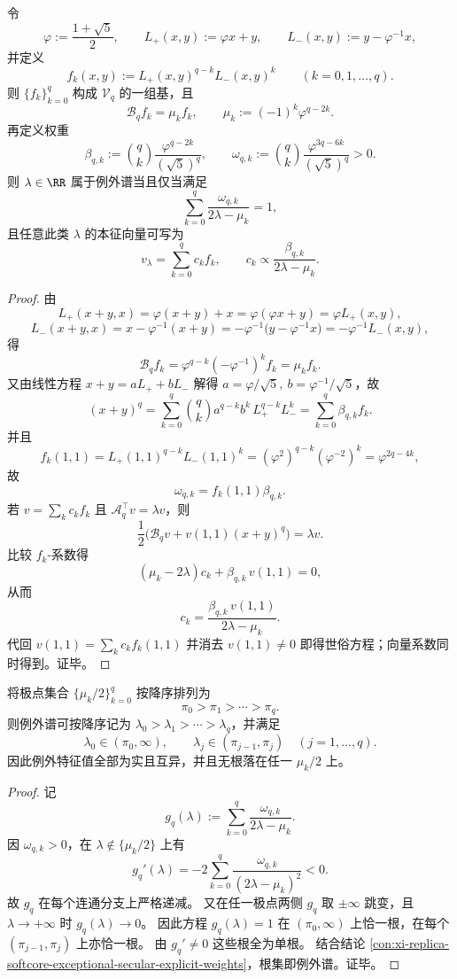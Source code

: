 \begin{conclusion}[例外谱的显式世俗方程与闭式本征向量]\label{con:xi-replica-softcore-exceptional-secular-explicit-weights}
令
\[
\varphi:=\frac{1+\sqrt5}{2},
\qquad
L_+(x,y):=\varphi x+y,
\qquad
L_-(x,y):=y-\varphi^{-1}x,
\]
并定义
\[
f_k(x,y):=L_+(x,y)^{q-k}L_-(x,y)^k
\qquad(k=0,1,\dots,q).
\]
则 \(\{f_k\}_{k=0}^{q}\) 构成 \(\mathcal V_q\) 的一组基，且
\[
\mathcal B_qf_k=\mu_kf_k,
\qquad
\mu_k:=(-1)^k\varphi^{q-2k}.
\]
再定义权重
\[
\beta_{q,k}:=\binom{q}{k}\frac{\varphi^{q-2k}}{(\sqrt5)^q},
\qquad
\omega_{q,k}:=\binom{q}{k}\frac{\varphi^{3q-6k}}{(\sqrt5)^q}>0.
\]
则 \(\lambda\in\RR\) 属于例外谱当且仅当满足
\[
\sum_{k=0}^{q}\frac{\omega_{q,k}}{2\lambda-\mu_k}=1,
\]
且任意此类 \(\lambda\) 的本征向量可写为
\[
v_\lambda=\sum_{k=0}^{q}c_kf_k,
\qquad
c_k\propto\frac{\beta_{q,k}}{2\lambda-\mu_k}.
\]
\end{conclusion}
\begin{proof}
由
\[
L_+(x+y,x)=\varphi(x+y)+x=\varphi(\varphi x+y)=\varphi L_+(x,y),
\]
\[
L_-(x+y,x)=x-\varphi^{-1}(x+y)=-\varphi^{-1}\bigl(y-\varphi^{-1}x\bigr)=-\varphi^{-1}L_-(x,y),
\]
得
\[
\mathcal B_qf_k=\varphi^{q-k}(-\varphi^{-1})^kf_k=\mu_kf_k.
\]
又由线性方程
\(
x+y=aL_++bL_-
\)
解得
\(
a=\varphi/\sqrt5,\ b=\varphi^{-1}/\sqrt5
\)，故
\[
(x+y)^q=\sum_{k=0}^{q}\binom{q}{k}a^{q-k}b^k\,L_+^{q-k}L_-^k
=\sum_{k=0}^{q}\beta_{q,k}f_k.
\]
并且
\[
f_k(1,1)=L_+(1,1)^{q-k}L_-(1,1)^k
=(\varphi^2)^{q-k}(\varphi^{-2})^k
=\varphi^{2q-4k},
\]
故
\[
\omega_{q,k}=f_k(1,1)\beta_{q,k}.
\]
若 \(v=\sum_kc_kf_k\) 且 \(\mathcal A_q^{\top}v=\lambda v\)，则
\[
\frac12\bigl(\mathcal B_qv+v(1,1)(x+y)^q\bigr)=\lambda v.
\]
比较 \(f_k\)-系数得
\[
(\mu_k-2\lambda)c_k+\beta_{q,k}\,v(1,1)=0,
\]
从而
\[
c_k=\frac{\beta_{q,k}\,v(1,1)}{2\lambda-\mu_k}.
\]
代回
\(
v(1,1)=\sum_kc_kf_k(1,1)
\)
并消去 \(v(1,1)\neq 0\) 即得世俗方程；向量系数同时得到。证毕。
\end{proof}

\begin{conclusion}\label{con:xi-replica-softcore-exceptional-secular-strict-interlacing}
将极点集合 \(\{\mu_k/2\}_{k=0}^{q}\) 按降序排列为
\[
\pi_0>\pi_1>\cdots>\pi_q.
\]
则例外谱可按降序记为 \(\lambda_0>\lambda_1>\cdots>\lambda_q\)，并满足
\[
\lambda_0\in(\pi_0,\infty),
\qquad
\lambda_j\in(\pi_{j-1},\pi_j)\quad(j=1,\dots,q).
\]
因此例外特征值全部为实且互异，并且无根落在任一 \(\mu_k/2\) 上。
\end{conclusion}
\begin{proof}
记
\[
g_q(\lambda):=\sum_{k=0}^{q}\frac{\omega_{q,k}}{2\lambda-\mu_k}.
\]
因 \(\omega_{q,k}>0\)，在 \(\lambda\notin\{\mu_k/2\}\) 上有
\[
g_q'(\lambda)=-2\sum_{k=0}^{q}\frac{\omega_{q,k}}{(2\lambda-\mu_k)^2}<0.
\]
故 \(g_q\) 在每个连通分支上严格递减。
又在任一极点两侧 \(g_q\) 取 \(\pm\infty\) 跳变，且 \(\lambda\to+\infty\) 时 \(g_q(\lambda)\to 0\)。
因此方程 \(g_q(\lambda)=1\) 在 \((\pi_0,\infty)\) 上恰一根，在每个 \((\pi_{j-1},\pi_j)\) 上亦恰一根。
由 \(g_q'\neq 0\) 这些根全为单根。
结合结论 \ref{con:xi-replica-softcore-exceptional-secular-explicit-weights}，根集即例外谱。证毕。
\end{proof}

